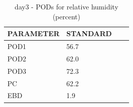 \begin{table}[p!]
\begin{center}
\begin{tabular}{|l|l|l|l|}
\hline
\multicolumn{1}{|c|}{\cellcolor[HTML]{C0C0C0}\textbf{PARAMETER}} & \multicolumn{1}{c|}{\cellcolor[HTML]{C0C0C0}\textbf{STANDARD}} \\
\hline
\cellcolor[HTML]{C0C0C0}POD1  & 56.7                                \\
\cellcolor[HTML]{C0C0C0}POD2  & 62.0                                \\
\cellcolor[HTML]{C0C0C0}POD3  & 72.3                                \\
\cellcolor[HTML]{C0C0C0}PC    & 62.2                                  \\
\cellcolor[HTML]{C0C0C0}EBD   & 1.9                                 \\
\hline
\end{tabular}
\caption{day3 - PODs for relative humidity (percent)}
\label{tab:podrh:day3}
\end{center}
\end{table}
